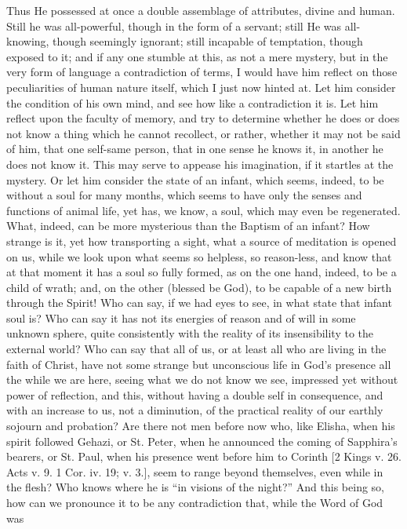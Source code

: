 Thus He possessed at once a double assemblage of attributes, divine
and human. Still he was all-powerful, though in the form of a servant;
still He was all-knowing, though seemingly ignorant; still incapable
of temptation, though exposed to it; and if any one stumble at this,
as not a mere mystery, but in the very form of language a
contradiction of terms, I would have him reflect on those
peculiarities of human nature itself, which I just now hinted at. Let
him consider the condition of his own mind, and see how like a
contradiction it is. Let him reflect upon the faculty of memory, and
try to determine whether he does or does not know a thing which he
cannot recollect, or rather, whether it may not be said of him, that
one self-same person, that in one sense he knows it, in another he
does not know it. This may serve to appease his imagination, if it
startles at the mystery. Or let him consider the state of an infant,
which seems, indeed, to be without a soul for many months, which seems
to have only the senses and functions of animal life, yet has, we
know, a soul, which may even be regenerated. What, indeed, can be more
mysterious than the Baptism of an infant? How strange is it, yet how
transporting a sight, what a source of meditation is opened on us,
while we look upon what seems so helpless, so reason-less, and know
that at that moment it has a soul so fully formed, as on the one hand,
indeed, to be a child of wrath; and, on the other (blessed be God), to
be capable of a new birth through the Spirit! Who can say, if we had
eyes to see, in what state that infant soul is? Who can say it has not
its energies of reason and of will in some unknown sphere, quite
consistently with the reality of its insensibility to the external
world? Who can say that all of us, or at least all who are living in
the faith of Christ, have not some strange but unconscious life in
God's presence all the while we are here, seeing what we do not know
we see, impressed yet without power of reflection, and this, without
having a double self in consequence, and with an increase to us, not a
diminution, of the practical reality of our earthly sojourn and
probation? Are there not men before now who, like Elisha, when his
spirit followed Gehazi, or St. Peter, when he announced the coming of
Sapphira's bearers, or St. Paul, when his presence went before him to
Corinth [2 Kings v. 26. Acts v. 9. 1 Cor. iv. 19; v. 3.], seem to
range beyond themselves, even while in the flesh? Who knows where he
is ``in visions of the night?'' And this being so, how can we
pronounce it to be any contradiction that, while the Word of God was
